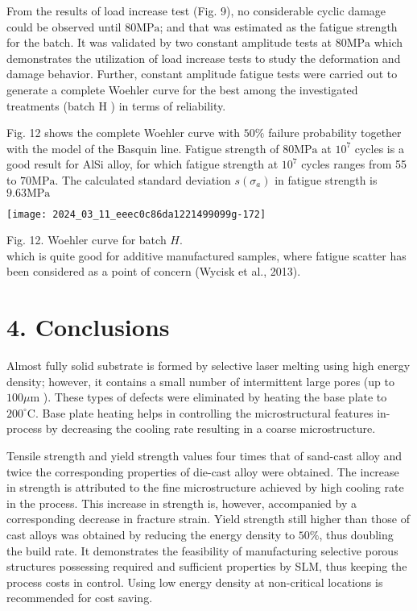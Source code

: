 \documentclass[10pt]{article}
\begin{document}
From the results of load increase test (Fig. 9), no considerable cyclic damage could be observed until $80 \mathrm{MPa}$; and that was estimated as the fatigue strength for the batch. It was validated by two constant amplitude tests at $80 \mathrm{MPa}$ which demonstrates the utilization of load increase tests to study the deformation and damage behavior. Further, constant amplitude fatigue tests were carried out to generate a complete Woehler curve for the best among the investigated treatments (batch $\mathrm{H}$ ) in terms of reliability.

Fig. 12 shows the complete Woehler curve with $50 \%$ failure probability together with the model of the Basquin line. Fatigue strength of $80 \mathrm{MPa}$ at $10^{7}$ cycles is a good result for AlSi alloy, for which fatigue strength at $10^{7}$ cycles ranges from 55 to $70 \mathrm{MPa}$. The calculated standard deviation $s\left(\sigma_{a}\right)$ in fatigue strength is $9.63 \mathrm{MPa}$

\begin{center}
\texttt{[image: 2024\_03\_11\_eeec0c86da1221499099g-172]}
\end{center}

Fig. 12. Woehler curve for batch $H$.\\
which is quite good for additive manufactured samples, where fatigue scatter has been considered as a point of concern (Wycisk et al., 2013).

\section*{4. Conclusions}
Almost fully solid substrate is formed by selective laser melting using high energy density; however, it contains a small number of intermittent large pores (up to $100 \mu \mathrm{m}$ ). These types of defects were eliminated by heating the base plate to $200^{\circ} \mathrm{C}$. Base plate heating helps in controlling the microstructural features in-process by decreasing the cooling rate resulting in a coarse microstructure.

Tensile strength and yield strength values four times that of sand-cast alloy and twice the corresponding properties of die-cast alloy were obtained. The increase in strength is attributed to the fine microstructure achieved by high cooling rate in the process. This increase in strength is, however, accompanied by a corresponding decrease in fracture strain. Yield strength still higher than those of cast alloys was obtained by reducing the energy density to $50 \%$, thus doubling the build rate. It demonstrates the feasibility of manufacturing selective porous structures possessing required and sufficient properties by SLM, thus keeping the process costs in control. Using low energy density at non-critical locations is recommended for cost saving.
\end{document}
